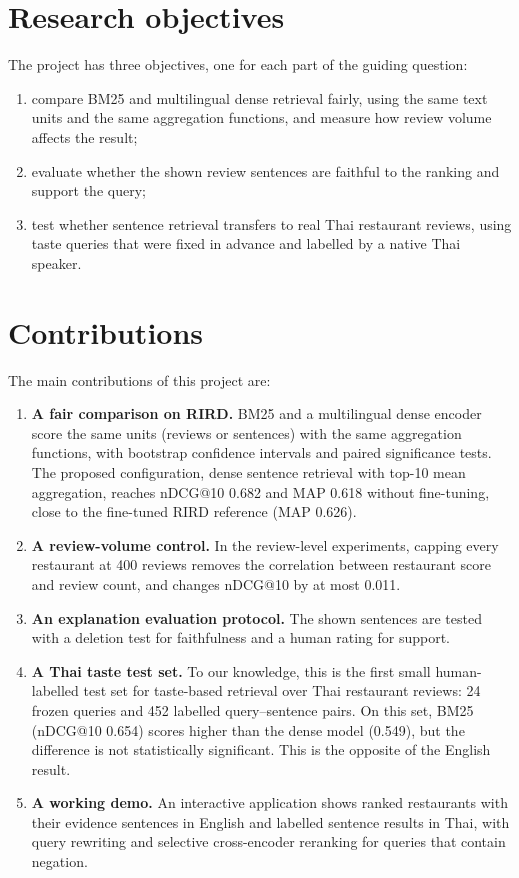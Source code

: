 \section{Research objectives}
The project has three objectives, one for each part of the guiding question:
\begin{enumerate}
  \item compare BM25 and multilingual dense retrieval fairly, using the same text units and
  the same aggregation functions, and measure how review volume affects the result;
  \item evaluate whether the shown review sentences are faithful to the ranking and support the
  query;
  \item test whether sentence retrieval transfers to real Thai restaurant reviews, using taste
  queries that were fixed in advance and labelled by a native Thai speaker.
\end{enumerate}

\section{Contributions}
The main contributions of this project are:
\begin{enumerate}
  \item \textbf{A fair comparison on RIRD.} BM25 and a multilingual dense encoder score the
  same units (reviews or sentences) with the same aggregation functions, with bootstrap
  confidence intervals and paired significance tests. The proposed configuration, dense
  sentence retrieval with top-10 mean aggregation, reaches nDCG@10 0.682 and MAP 0.618 without
  fine-tuning, close to the fine-tuned RIRD reference (MAP 0.626).
  \item \textbf{A review-volume control.} In the review-level experiments, capping every
  restaurant at 400 reviews removes the correlation between restaurant score and review count,
  and changes nDCG@10 by at most 0.011.
  \item \textbf{An explanation evaluation protocol.} The shown sentences are tested with a
  deletion test for faithfulness and a human rating for support.
  \item \textbf{A Thai taste test set.} To our knowledge, this is the first small
  human-labelled test set for taste-based retrieval over Thai restaurant reviews: 24 frozen
  queries and 452 labelled query--sentence pairs. On this set, BM25 (nDCG@10 0.654) scores
  higher than the dense model (0.549), but the difference is not statistically significant.
  This is the opposite of the English result.
  \item \textbf{A working demo.} An interactive application shows ranked restaurants with
  their evidence sentences in English and labelled sentence results in Thai, with query
  rewriting and selective cross-encoder reranking for queries that contain negation.
\end{enumerate}

